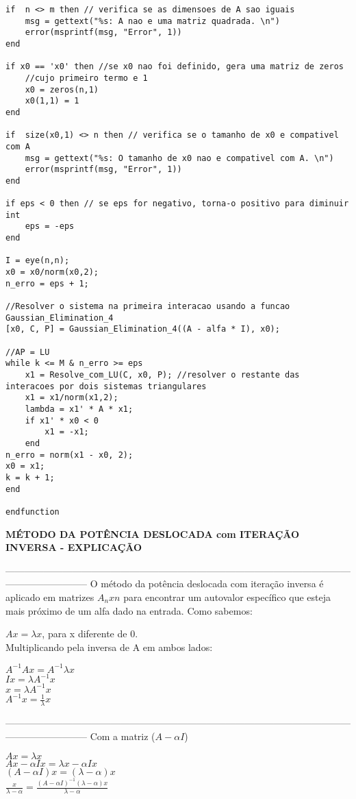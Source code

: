 \documentclass[leqno]{article}
\numberwithin{equation}{section}
\begin{document}
\begin{enumerate}
\begin{sol}
\begin{lstlisting}
if  n <> m then // verifica se as dimensoes de A sao iguais
	msg = gettext("%s: A nao e uma matriz quadrada. \n")
	error(msprintf(msg, "Error", 1))
end

if x0 == 'x0' then //se x0 nao foi definido, gera uma matriz de zeros
	//cujo primeiro termo e 1
	x0 = zeros(n,1)
	x0(1,1) = 1
end

if  size(x0,1) <> n then // verifica se o tamanho de x0 e compativel com A
	msg = gettext("%s: O tamanho de x0 nao e compativel com A. \n")
	error(msprintf(msg, "Error", 1))
end

if eps < 0 then // se eps for negativo, torna-o positivo para diminuir int
	eps = -eps
end

I = eye(n,n);
x0 = x0/norm(x0,2);
n_erro = eps + 1;

//Resolver o sistema na primeira interacao usando a funcao Gaussian_Elimination_4
[x0, C, P] = Gaussian_Elimination_4((A - alfa * I), x0);

//AP = LU
while k <= M & n_erro >= eps
	x1 = Resolve_com_LU(C, x0, P); //resolver o restante das interacoes por dois sistemas triangulares
	x1 = x1/norm(x1,2);
	lambda = x1' * A * x1;
	if x1' * x0 < 0 
		x1 = -x1;
	end
n_erro = norm(x1 - x0, 2);
x0 = x1;
k = k + 1;
end

endfunction
			\end{lstlisting}
		
		\textbf{{\large MÉTODO DA POTÊNCIA DESLOCADA com ITERAÇÃO INVERSA - EXPLICAÇÃO}}
		
		--------------------------------------------------------------------------------------------------------------------------------------	
		O método da potência deslocada com iteração inversa é aplicado em matrizes $A_nxn$ para encontrar um autovalor específico que esteja mais próximo de um alfa dado na entrada. Como sabemos:
		
		$Ax = \lambda x$, para x diferente de 0.\\
		Multiplicando pela inversa de A em ambos lados:
		
		$A^{-1}Ax = A^{-1}\lambda x$\\
		$Ix = \lambda A^{-1}x$\\
		$x = \lambda A^{-1}x$\\
		$A^{-1}x = \frac{1}{\lambda}x$
		
		--------------------------------------------------------------------------------------------------------------------------------------
		Com a matriz ($A - \alpha I$)
		
		$A x = \lambda x$\\
		$Ax - \alpha Ix = \lambda x - \alpha I x$\\
		$(A - \alpha I)x = (\lambda - \alpha)x$\\
		$\frac{x}{\lambda - \alpha} = \frac{(A - \alpha I)^{-1} (\lambda - \alpha)x}{\lambda - \alpha}$
		

\end{sol}
\end{enumerate}
\end{document}
